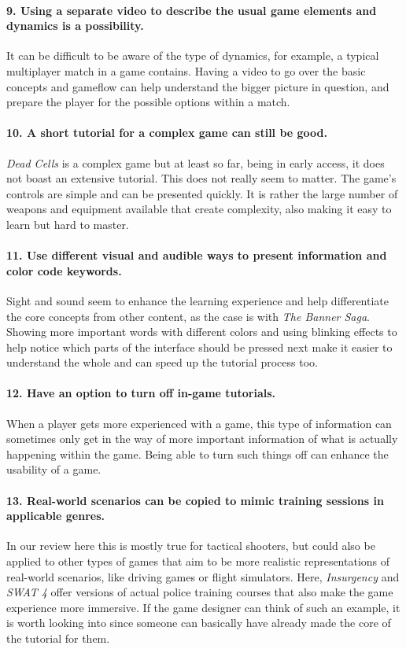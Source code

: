 \paragraph{9. Using a separate video to describe the usual game elements and dynamics is a possibility.}
It can be difficult to be aware of the type of dynamics, for example, a typical multiplayer match in a game contains. Having a video to go over the basic concepts and gameflow can help understand the bigger picture in question, and prepare the player for the possible options within a match.
\paragraph{10. A short tutorial for a complex game can still be good.}
\textit{Dead Cells} is a complex game but at least so far, being in early access, it does not boast an extensive tutorial. This does not really seem to matter. The game's controls are simple and can be presented quickly. It is rather the large number of weapons and equipment available that create complexity, also making it easy to learn but hard to master. 
\paragraph{11. Use different visual and audible ways to present information and color code keywords.}
Sight and sound seem to enhance the learning experience and help differentiate the core concepts from other content, as the case is with \textit{The Banner Saga}. Showing more important words with different colors and using blinking effects to help notice which parts of the interface should be pressed next make it easier to understand the whole and can speed up the tutorial process too.
\paragraph{12. Have an option to turn off in-game tutorials.}
When a player gets more experienced with a game, this type of information can sometimes only get in the way of more important information of what is actually happening within the game. Being able to turn such things off can enhance the usability of a game.
\paragraph{13. Real-world scenarios can be copied to mimic training sessions in applicable genres.} In our review here this is mostly true for tactical shooters, but could also be applied to other types of games that aim to be more realistic representations of real-world scenarios, like driving games or flight simulators. Here, \textit{Insurgency} and \textit{SWAT 4} offer versions of actual police training courses that also make the game experience more immersive. If the game designer can think of such an example, it is worth looking into since someone can basically have already made the core of the tutorial for them.
